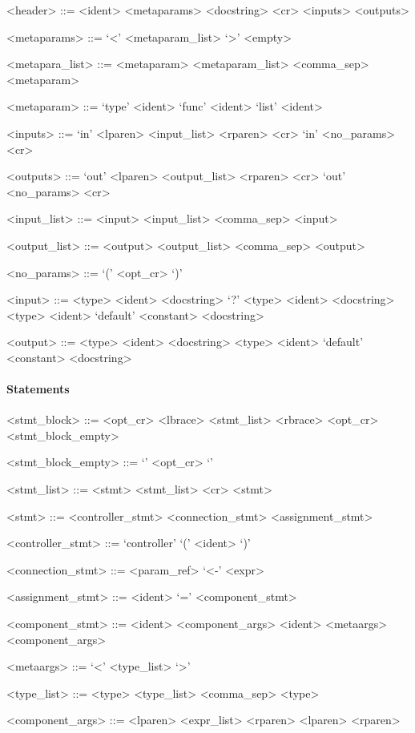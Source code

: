 \begin{grammar}
  <header> ::= <ident> <metaparams> <docstring> <cr> <inputs> <outputs>

  <metaparams> ::= `\textless' <metaparam_list> `\textgreater'
  \alt <empty>

  <metapara_list> ::= <metaparam>
  \alt <metaparam_list> <comma_sep> <metaparam>

  <metaparam> ::= `type' <ident>
  \alt `func' <ident>
  \alt `list' <ident>

  <inputs> ::= `in' <lparen> <input_list> <rparen> <cr>
  \alt `in' <no_params> <cr>

  <outputs> ::= `out' <lparen> <output_list> <rparen> <cr>
  \alt `out' <no_params> <cr>

  <input_list> ::= <input>
  \alt <input_list> <comma_sep> <input>

  <output_list> ::= <output>
  \alt <output_list> <comma_sep> <output>

  <no_params> ::= `(' <opt_cr> `)'

  <input> ::= <type> <ident> <docstring>
  \alt `?' <type> <ident> <docstring>
  \alt <type> <ident> `default' <constant> <docstring>

  <output> ::= <type> <ident> <docstring>
  \alt <type> <ident> `default' <constant> <docstring>
\end{grammar}


\paragraph{Statements}

\begin{grammar}
  <stmt_block> ::= <opt_cr> <lbrace> <stmt_list> <rbrace>
  \alt <opt_cr> <stmt_block_empty>

  <stmt_block_empty> ::= `{' <opt_cr> `}'

  <stmt_list> ::= <stmt>
  \alt <stmt_list> <cr> <stmt>

  <stmt> ::= <controller_stmt>
  \alt <connection_stmt>
  \alt <assignment_stmt>

  <controller_stmt> ::= `controller' `(' <ident> `)'

  <connection_stmt> ::= <param_ref> `\textless-' <expr>

  <assignment_stmt> ::= <ident> `=' <component_stmt>

  <component_stmt> ::= <ident> <component_args>
  \alt <ident> <metaargs> <component_args>

  <metaargs> ::= `\textless' <type_list> `\textgreater'

  <type_list> ::= <type>
  \alt <type_list> <comma_sep> <type>

  <component_args> ::= <lparen> <expr_list> <rparen>
  \alt <lparen> <rparen>
\end{grammar}


